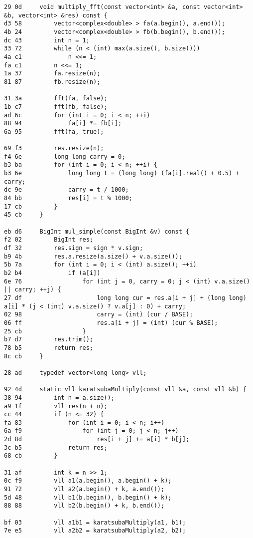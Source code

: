 \documentclass[11pt, a4paper, twoside]{article}
\begin{document}
\begin{lstlisting}
29 0d     void multiply_fft(const vector<int> &a, const vector<int> &b, vector<int> &res) const {
d3 58         vector<complex<double> > fa(a.begin(), a.end());
4b 24         vector<complex<double> > fb(b.begin(), b.end());
dc 43         int n = 1;
33 72         while (n < (int) max(a.size(), b.size()))
4a c1             n <<= 1;
fa c1         n <<= 1;
1a 37         fa.resize(n);
81 87         fb.resize(n);
      
31 3a         fft(fa, false);
1b c7         fft(fb, false);
ad 6c         for (int i = 0; i < n; ++i)
88 94             fa[i] *= fb[i];
6a 95         fft(fa, true);
      
69 f3         res.resize(n);
f4 6e         long long carry = 0;
b3 ba         for (int i = 0; i < n; ++i) {
b3 6e             long long t = (long long) (fa[i].real() + 0.5) + carry;
dc 9e             carry = t / 1000;
84 bb             res[i] = t % 1000;
17 cb         }
45 cb     }
      
eb d6     BigInt mul_simple(const BigInt &v) const {
f2 02         BigInt res;
df 32         res.sign = sign * v.sign;
b9 4b         res.a.resize(a.size() + v.a.size());
5b 7a         for (int i = 0; i < (int) a.size(); ++i)
b2 b4             if (a[i])
6e 76                 for (int j = 0, carry = 0; j < (int) v.a.size() || carry; ++j) {
27 df                     long long cur = res.a[i + j] + (long long) a[i] * (j < (int) v.a.size() ? v.a[j] : 0) + carry;
02 98                     carry = (int) (cur / BASE);
06 ff                     res.a[i + j] = (int) (cur % BASE);
25 cb                 }
b7 d7         res.trim();
78 b5         return res;
8c cb     }
      
28 ad     typedef vector<long long> vll;
      
92 4d     static vll karatsubaMultiply(const vll &a, const vll &b) {
38 94         int n = a.size();
a9 1f         vll res(n + n);
cc 44         if (n <= 32) {
fa 83             for (int i = 0; i < n; i++)
6a f9                 for (int j = 0; j < n; j++)
2d 8d                     res[i + j] += a[i] * b[j];
3c b5             return res;
68 cb         }
      
31 af         int k = n >> 1;
0c f9         vll a1(a.begin(), a.begin() + k);
91 72         vll a2(a.begin() + k, a.end());
5d 48         vll b1(b.begin(), b.begin() + k);
88 88         vll b2(b.begin() + k, b.end());
      
bf 03         vll a1b1 = karatsubaMultiply(a1, b1);
7e e5         vll a2b2 = karatsubaMultiply(a2, b2);
      

\end{lstlisting}
\end{document}

